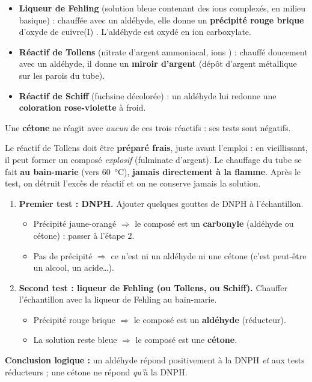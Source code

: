 \documentclass[11pt]{article}
\begin{document}
\begin{propriete}
\begin{itemize}
\item \textbf{Liqueur de Fehling} (solution bleue contenant des ions  complexés, en milieu basique) : chauffée avec un aldéhyde, elle donne un \textbf{précipité rouge brique} d'oxyde de cuivre(I) . L'aldéhyde est oxydé en ion carboxylate.
\item \textbf{Réactif de Tollens} (nitrate d'argent ammoniacal, ions \ce{[Ag(NH3)2]+}) : chauffé doucement avec un aldéhyde, il donne un \textbf{miroir d'argent} (dépôt d'argent métallique  sur les parois du tube).
\item \textbf{Réactif de Schiff} (fuchsine décolorée) : un aldéhyde lui redonne une \textbf{coloration rose-violette} à froid.
\end{itemize}
Une \textbf{cétone} ne réagit avec \emph{aucun} de ces trois réactifs : ses tests sont négatifs.
\end{propriete}

\begin{attention}
Le réactif de Tollens doit être \textbf{préparé frais}, juste avant l'emploi : en vieillissant, il peut former un composé \emph{explosif} (fulminate d'argent). Le chauffage du tube se fait \textbf{au bain-marie} (vers \SI{60}{\celsius}), \textbf{jamais directement à la flamme}. Après le test, on détruit l'excès de réactif et on ne conserve jamais la solution.
\end{attention}

\begin{methode}
\begin{enumerate}
\item \textbf{Premier test : DNPH.} Ajouter quelques gouttes de DNPH à l'échantillon.
   \begin{itemize}
   \item Précipité jaune-orangé $\Rightarrow$ le composé est un \textbf{carbonyle} (aldéhyde ou cétone) : passer à l'étape 2.
   \item Pas de précipité $\Rightarrow$ ce n'est ni un aldéhyde ni une cétone (c'est peut-être un alcool, un acide\ldots).
   \end{itemize}
\item \textbf{Second test : liqueur de Fehling (ou Tollens, ou Schiff).} Chauffer l'échantillon avec la liqueur de Fehling au bain-marie.
   \begin{itemize}
   \item Précipité rouge brique $\Rightarrow$ le composé est un \textbf{aldéhyde} (réducteur).
   \item La solution reste bleue $\Rightarrow$ le composé est une \textbf{cétone}.
   \end{itemize}
\end{enumerate}
\textbf{Conclusion logique :} un aldéhyde répond positivement à la DNPH \emph{et} aux tests réducteurs ; une cétone ne répond \emph{qu'}à la DNPH.
\end{methode}
\end{document}
